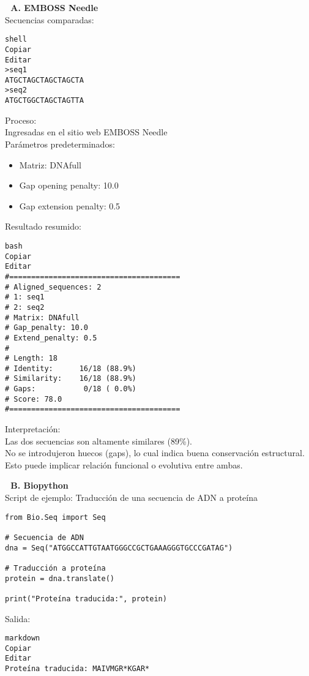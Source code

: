 \documentclass[fleqn,10pt]{article}
\begin{document}
\textbf{🧪 A. EMBOSS Needle}\\[0.5em]
Secuencias comparadas:\\[0.5em]

\begin{lstlisting}[style=outputstyle]
shell
Copiar
Editar
>seq1
ATGCTAGCTAGCTAGCTA
>seq2
ATGCTGGCTAGCTAGTTA
\end{lstlisting}

Proceso:\\[0.3em]
Ingresadas en el sitio web EMBOSS Needle\\[0.3em]
Parámetros predeterminados:
\begin{itemize}
    \item Matriz: DNAfull
    \item Gap opening penalty: 10.0
    \item Gap extension penalty: 0.5
\end{itemize}

Resultado resumido:
\begin{lstlisting}[style=outputstyle]
bash
Copiar
Editar
#=======================================
# Aligned_sequences: 2
# 1: seq1
# 2: seq2
# Matrix: DNAfull
# Gap_penalty: 10.0
# Extend_penalty: 0.5
#
# Length: 18
# Identity:      16/18 (88.9%)
# Similarity:    16/18 (88.9%)
# Gaps:           0/18 ( 0.0%)
# Score: 78.0
#=======================================
\end{lstlisting}

Interpretación:\\[0.3em]
Las dos secuencias son altamente similares (89\%).\\
No se introdujeron huecos (gaps), lo cual indica buena conservación estructural.\\
Esto puede implicar relación funcional o evolutiva entre ambas.

\medskip

\textbf{🧪 B. Biopython}\\[0.5em]
Script de ejemplo: Traducción de una secuencia de ADN a proteína
\begin{lstlisting}[style=pythonstyle]
from Bio.Seq import Seq

# Secuencia de ADN
dna = Seq("ATGGCCATTGTAATGGGCCGCTGAAAGGGTGCCCGATAG")

# Traducción a proteína
protein = dna.translate()

print("Proteína traducida:", protein)
\end{lstlisting}

Salida:
\begin{lstlisting}[style=outputstyle]
markdown
Copiar
Editar
Proteína traducida: MAIVMGR*KGAR*
\end{lstlisting}
\end{document}
